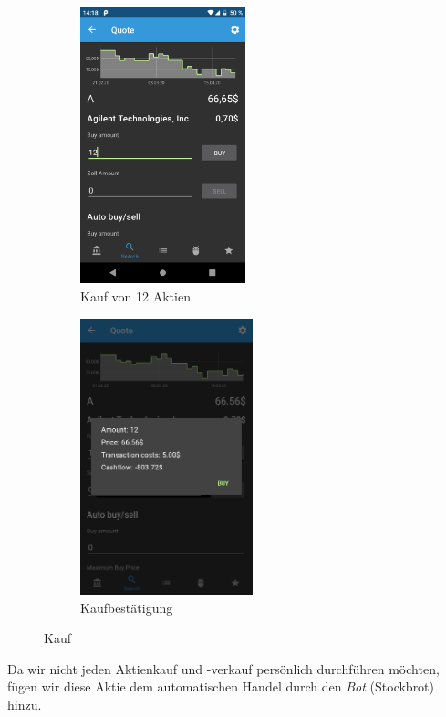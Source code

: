\documentclass[a4paper]{article}
\begin{document}
\begin{figure}[H]
	\begin{subfigure}{.5\textwidth}
		\centering
		\includegraphics[height=8cm,keepaspectratio]{./images/demo/buy_a.png}
		\caption{Kauf von 12 Aktien}
		\label{fig:demo:buy_a}
	\end{subfigure}
	\begin{subfigure}{.5\textwidth}
		\centering
		\includegraphics[height=8cm,keepaspectratio]{./images/demo/buy_a_confirm.png}
		\caption{Kaufbestätigung}
		\label{fig:demo:buy_a_confirm}
	\end{subfigure}
	\caption{Kauf}
	\label{fig:demo:buy}
\end{figure}

Da wir nicht jeden Aktienkauf und -verkauf persönlich durchführen möchten, fügen wir diese Aktie dem automatischen Handel durch den \textit{Bot} (Stockbrot) hinzu.
\end{document}
